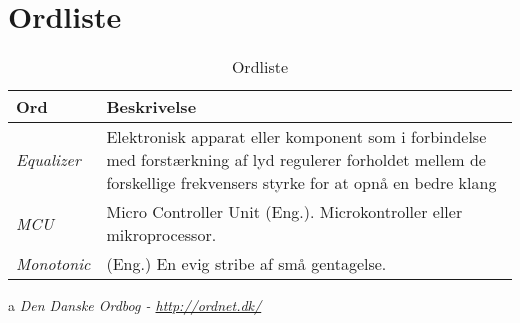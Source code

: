 \chapter{Ordliste} \label{bilag:ordliste}

\begin{table}[h!]
	\caption{Ordliste}
	\label{tab:ordliste}
	\begin{threeparttable}
		\begin{tabular}{l p{}}
			\toprule
			\textbf{Ord}      & \textbf{Beskrivelse}   \\ 
			\midrule
			\textit{Equalizer} & Elektronisk apparat eller komponent som i forbindelse med forstærkning af lyd regulerer forholdet mellem de forskellige frekvensers styrke for at opnå en bedre klang \tnote{a} \\
			\textit{MCU}       & Micro Controller Unit (Eng.). Microkontroller eller mikroprocessor. \\
			\textit{Monotonic} & (Eng.) En evig stribe af små gentagelse.  \tnote{a}\\
			\bottomrule
		\end{tabular}
	
		\begin{tablenotes}
			\item[a] \textit{Den Danske Ordbog - \url{http://ordnet.dk/}}
		\end{tablenotes}
	\end{threeparttable}
\end{table}
